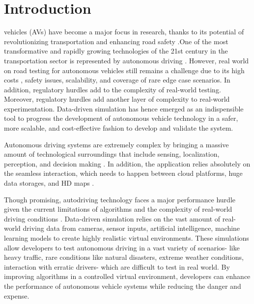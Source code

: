 \documentclass[lettersize,journal]{IEEEtran}
\begin{document}
\section{Introduction}
 vehicles (AVs) have become a major focus in research, thanks to its potential of revolutionizing transportation and enhancing road safety \cite{janai2020computer}.One of the most transformative and rapidly growing technologies of the 21st century in the transportation sector is represented by autonomous driving \cite{mirzai2023future}. However, real world on road testing for autonomous vehicles still remains a challenge due to its high costs \cite{NEURIPS2023_1838feeb} , safety issues, scalability, and coverage of rare edge case scenarios. In addition, regulatory hurdles add to the complexity of real-world testing. Moreover, regulatory hurdles add another layer of complexity to real-world experimentation. Data-driven simulation has hence emerged as an indispensible tool to progress the development of autonomous vehicle technology in a safer, more scalable, and cost-effective fashion to develop and validate the system.

Autonomous driving systems are extremely complex by bringing a massive amount of technological surroundings that include sensing, localization, perception, and decision making \cite{liu2017computer}. In addition, the application relies absolutely on the seamless interaction, which needs to happen between cloud platforms, huge data storages, and HD maps \cite{liu2017computer}.

Though promising, autodriving technology faces a major performance hurdle given the current limitations of algorithms and the complexity of real-world driving conditions  \cite{li2023datacentric}. Data-driven simulation relies on the vast amount of real-world driving data from cameras, sensor inputs, artificial intelligence, machine learning models to create highly realistic virtual environments. These simulations allow developers to test autonomous driving in a vast variety of scenarios- like heavy traffic, rare conditions like natural disasters, extreme weather conditions, interaction with erratic drivers- which are difficult to test in real world. By improving algorithms in a controlled virtual environment, developers can enhance the performance of autonomous vehicle systems while reducing the danger and expense.
\end{document}
